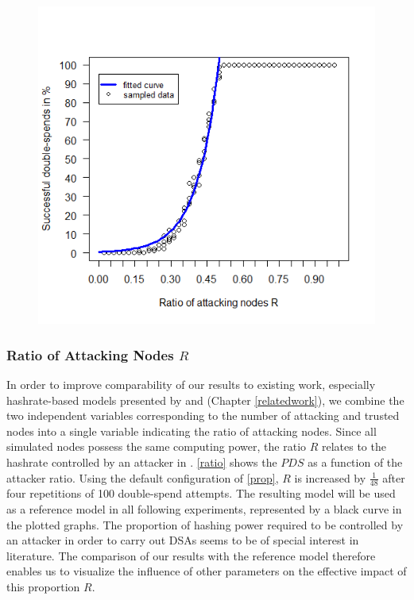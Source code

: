 \documentclass[a4paper,12pt,twoside]{report}
\begin{document}
\begin{figure}
\begin{minipage}{.5\textwidth}
  \includegraphics[width=\linewidth]{Experiments/Ratio/ratio_f.png}
  \label{ratio}
\end{minipage}
\end{figure}

\subsubsection{Ratio of Attacking Nodes $R$}
In order to improve comparability of our results to existing work, especially hashrate-based models presented by \cite{HBDSA} and \cite{DSAwithTime} (Chapter \ref{relatedwork}), we combine the two independent variables corresponding to the number of attacking and trusted nodes into a single variable indicating the ratio of attacking nodes. Since all simulated nodes possess the same computing power, the ratio $R$ relates to the hashrate controlled by an attacker in \cite{nakamoto2008bitcoin,HBDSA,DSAwithTime}. \autoref{ratio} shows the $PDS$ as a function of the attacker ratio. Using the default configuration of \autoref{prop}, $R$ is increased by $\frac{1}{48}$ after four repetitions of 100 double-spend attempts. The resulting model will be used as a reference model in all following experiments, represented by a black curve in the plotted graphs. The proportion of hashing power required to be controlled by an attacker in order to carry out DSAs seems to be of special interest in literature. The comparison of our results with the reference model therefore enables us to visualize the influence of other parameters on the effective impact of this proportion $R$.
\end{document}
